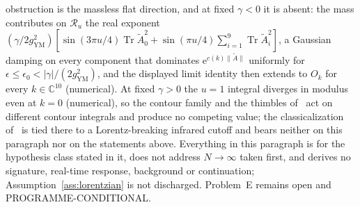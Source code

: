 obstruction is the massless flat direction, and at fixed \(\gamma<0\) it is absent: the mass contributes on \(\mathcal R_u\) the real exponent \((\gamma/2g_{\mathrm{YM}}^2)[\sin(3\pi u/4)\operatorname{Tr}\tilde A_0^2+\sin(\pi u/4)\sum_{i=1}^{9}\operatorname{Tr}\tilde A_i^2]\), a Gaussian damping on every component that dominates \(\mathrm e^{c(k)\|\tilde A\|}\) uniformly for \(\epsilon\le\epsilon_0<|\gamma|/(2g_{\mathrm{YM}}^2)\), and the displayed limit identity then extends to \(O_k\) for every \(k\in\mathbb C^{10}\) (numerical). At fixed \(\gamma>0\) the \(u=1\) integral diverges in modulus even at \(k=0\) (numerical), so the contour family and the thimbles of~\cite{ChouNishimuraTripathi2025} act on different contour integrals and produce no competing value; the classicalization of~\cite{AsanoNishimuraPiensukYamamori2025} is tied there to a Lorentz-breaking infrared cutoff and bears neither on this paragraph nor on the statements above. Everything in this paragraph is for the hypothesis class stated in it, does not address \(N\to\infty\) taken first, and derives no signature, real-time response, background or continuation; Assumption~\ref{ass:lorentzian} is not discharged. Problem~E remains open and PROGRAMME-CONDITIONAL.

